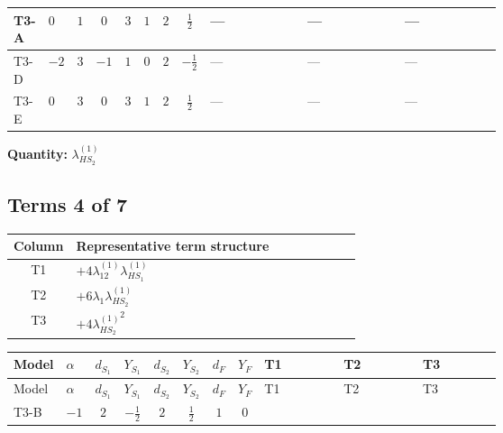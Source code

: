 \documentclass[8pt]{article}
\begin{document}
\begin{landscape}
\begin{longtable}{@{}llcccccc >{\raggedright\arraybackslash}p{0.21\linewidth} >{\raggedright\arraybackslash}p{0.21\linewidth} >{\raggedright\arraybackslash}p{0.21\linewidth}@{}}
\midrule
T3-A & $0$ & $1$ & $0$ & $3$ & $1$ & $2$ & $\frac{1}{2}$ & --- & --- & --- \\
\midrule
T3-D & $-2$ & $3$ & $-1$ & $1$ & $0$ & $2$ & $-\frac{1}{2}$ & --- & --- & --- \\
\midrule
T3-E & $0$ & $3$ & $0$ & $3$ & $1$ & $2$ & $\frac{1}{2}$ & --- & --- & --- \\
\midrule
\bottomrule
\end{longtable}
\clearpage
\noindent\textbf{Quantity: }$\lambda_{HS_2}^{(1)}$\par\smallskip
\subsection*{Terms 4 of 7}
\begin{center}
\begin{tabular}{@{}c >{\raggedright\arraybackslash}p{0.82\linewidth}@{}}
\toprule
Column & Representative term structure \\
\midrule
T1 & \(\displaystyle +4 {\lambda_{12}^{(1)}} {\lambda_{HS_1}^{(1)}}\) \\
\midrule
T2 & \(\displaystyle +6 {\lambda_1} {\lambda_{HS_2}^{(1)}}\) \\
\midrule
T3 & \(\displaystyle +4 {\lambda_{HS_2}^{(1)}}^2\) \\
\midrule
\bottomrule
\end{tabular}
\end{center}
\smallskip
\tiny
\begin{longtable}{@{}llcccccc >{\raggedright\arraybackslash}p{0.21\linewidth} >{\raggedright\arraybackslash}p{0.21\linewidth} >{\raggedright\arraybackslash}p{0.21\linewidth}@{}}
\toprule
Model & $\alpha$ & $d_{S_1}$ & $Y_{S_1}$ & $d_{S_2}$ & $Y_{S_2}$ & $d_F$ & $Y_F$ & T1 & T2 & T3 \\
\midrule
\endfirsthead
\toprule
Model & $\alpha$ & $d_{S_1}$ & $Y_{S_1}$ & $d_{S_2}$ & $Y_{S_2}$ & $d_F$ & $Y_F$ & T1 & T2 & T3 \\
\midrule
\endhead
T3-B & $-1$ & $2$ & $-\frac{1}{2}$ & $2$ & $\frac{1}{2}$ & $1$ & $0$ & \scriptsize\adjustbox{max width=\linewidth}{$\begin{gathered} +4 {\lambda_{12}^{(1)}} {\lambda_{HS_1}^{(1)}}\end{gathered}$} & \scriptsize\adjustbox{max width=\linewidth}{$\begin{gathered} +6 {\lambda_1} {\lambda_{HS_2}^{(1)}}\end{gathered}$} & \scriptsize\adjustbox{max width=\linewidth}{$\begin{gathered} +4 {\lambda_{HS_2}^{(1)}}^2\end{gathered}$} \\

\end{longtable}
\end{landscape}
\end{document}
